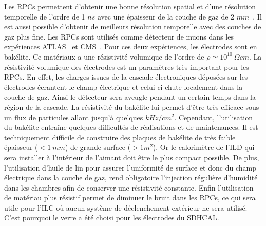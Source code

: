 Les RPCs permettent d'obtenir une bonne résolution spatial et d'une résolution temporelle de l'ordre de 1 $ns$ avec une épaisseur de la couche de gaz de 2 $mm$~\cite{riegler}. Il est aussi possible d'obtenir de meilleurs résolution temporelle avec des couches de gaz plus fine. Les RPCs sont utilisés comme détecteur de muons dans les expériences ATLAS~\cite{atlas} et CMS~\cite{cms}. Pour ces deux expériences, les électrodes sont en bakélite. Ce matériaux a une résistivité volumique de l'ordre de $\rho\simeq10^{10}~\Omega cm$. La résistivité volumique des électrodes est un paramètres très important pour les RPCs. En effet, les charges issues de la cascade électroniques déposées sur les électrodes écrantent le champ électrique et celui-ci chute localement dans la couche de gaz. Ainsi le détecteur sera aveugle pendant un certain temps dans la région de la cascade. La résistivité du bakélite lui permet d'être très efficace sous un flux de particules allant jusqu'à quelques $kHz/cm^2$. Cependant, l'utilisation du bakélite entraîne quelques difficultés de réalisations et de maintenances. Il est techniquement difficile de construire des plaques de bakélite de très faible épaisseur ($<1~mm$) de grande surface ($>1m^2$). Or le calorimètre de l'ILD qui sera installer à l'intérieur de l'aimant doit être le plus compact possible. De plus, l'utilisation d'huile de lin pour assurer l'uniformité de surface et donc du champ électrique dans la couche de gaz, rend obligatoire l'injection régulière d'humidité dans les chambres afin de conserver une résistivité constante. Enfin l'utilisation de matériau plus résistif permet de diminuer le bruit dans les RPCs, ce qui sera utile pour l'ILC où aucun système de déclenchement extérieur ne sera utilisé. C'est pourquoi le verre a été choisi pour les électrodes du SDHCAL.

